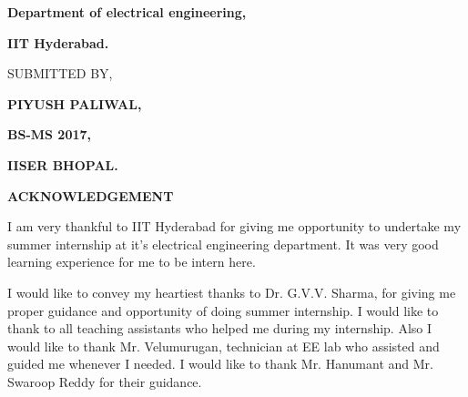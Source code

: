 \documentclass[12pt]{article}
\begin{document}
{\fontsize{24.88pt}{28.8pt}\selectfont \textbf{Department of electrical engineering,}\par}\par

{\fontsize{24.88pt}{28.8pt}\selectfont \textbf{IIT Hyderabad.}\par}\par

\vspace{\baselineskip}

\vspace{\baselineskip}
{\fontsize{17.28pt}{19.2pt}\selectfont SUBMITTED BY,\par}\par

\vspace{\baselineskip}
{\fontsize{20.74pt}{24.0pt}\selectfont \textbf{PIYUSH PALIWAL,}\par}\par

{\fontsize{20.74pt}{24.0pt}\selectfont \textbf{BS-MS 2017,}\par}\par

{\fontsize{20.74pt}{24.0pt}\selectfont \textbf{IISER BHOPAL.}\par}\par

\newpage

{\fontsize{17.28pt}{19.2pt}\selectfont \textbf{ACKNOWLEDGEMENT}\par}\par

\vspace{\baselineskip}
{\fontsize{17.28pt}{19.2pt}\selectfont I am very thankful to IIT Hyderabad for giving me opportunity to undertake my summer internship at it’s electrical engineering department. It was very good learning experience for me to be intern here.\par}\par

\vspace{\baselineskip}
{\fontsize{17.28pt}{19.2pt}\selectfont I would like to convey my heartiest thanks to Dr. G.V.V. Sharma, for giving me proper guidance and opportunity of doing summer internship. I would like to thank to all teaching assistants who helped me during my internship. Also I would like to thank Mr. Velumurugan, technician at EE lab who assisted and guided me whenever I needed. I would like to thank Mr. Hanumant and Mr. Swaroop Reddy for their guidance.\par}\par
\end{document}
